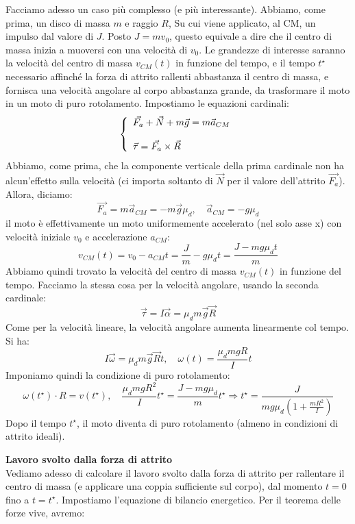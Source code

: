 \documentclass[a4paper,12pt]{article}
\begin{document}
\begin{itemize}
    Facciamo adesso un caso più complesso (e più interessante). Abbiamo, come prima, un disco di massa $m$ e raggio $R$, Su cui viene applicato,
    al CM, un impulso dal valore di $J$. Posto $J = mv_0$, questo equivale a dire che il centro di massa inizia a muoversi con una velocità di $v_0$.
    Le grandezze di interesse saranno la velocità del centro di massa $v_{CM}(t)$ in funzione del tempo, e il tempo $t^\star$ necessario affinché la forza di attrito
    rallenti abbastanza il centro di massa, e fornisca una velocità angolare al corpo abbastanza grande, da trasformare il moto in un moto di puro rotolamento.
    Impostiamo le equazioni cardinali:
    $$ 
    \left\{\begin{array}{l}
        \vec{F_a} + \vec{N} + m\vec{g} = m\vec{a}_{CM} \cr \\ 
        \vec{\tau} = \vec{F_a} \times \vec{R}
    \end{array}\right.
    $$
    Abbiamo, come prima, che la componente verticale della prima cardinale non ha alcun'effetto sulla velocità (ci importa soltanto di $\vec{N}$ per il valore dell'attrito $\vec{F_a}$).
    Allora, diciamo:
    $$ \vec{F_a} = m\vec{a}_{CM} = -m\vec{g}\mu_d, \quad \vec{a}_{CM} = -g\mu_d $$
    il moto è effettivamente un moto uniformemente accelerato (nel solo asse x) con velocità iniziale $v_0$ e accelerazione $a_{CM}$:
    $$ v_{CM}(t) = v_0 - a_{CM}t = \frac{J}{m} - g\mu_dt = \frac{J - mg\mu_dt}{m} $$
    Abbiamo quindi trovato la velocità del centro di massa $v_{CM}(t)$ in funzione del tempo. Facciamo la stessa cosa per la velocità
    angolare, usando la seconda cardinale:
    $$ \vec{\tau} = I\vec{\alpha} = \mu_dm\vec{g}\vec{R}$$
    Come per la velocità lineare, la velocità angolare aumenta linearmente col tempo. Si ha:
    $$ I\vec{\omega} = \mu_dm\vec{g}\vec{R}t, \quad \omega(t) = \frac{\mu_dmgR}{I}t $$
    Imponiamo quindi la condizione di puro rotolamento:
    $$ \omega(t^\star) \cdot R = v(t^\star), \quad \frac{\mu_dmgR^2}{I}t^\star = \frac{J-mg\mu_d}{m}t^\star \Rightarrow t^\star = \frac{J}{mg\mu_d\left( 1 + \frac{mR^2}{I} \right)}$$
    Dopo il tempo $t^\star$, il moto diventa di puro rotolamento (almeno in condizioni di attrito ideali).
    \par\smallskip
    \textbf{Lavoro svolto dalla forza di attrito} \\
     Vediamo adesso di calcolare il lavoro svolto dalla forza di attrito per rallentare il centro di massa (e applicare una coppia sufficiente sul corpo), dal momento
     $t = 0$ fino a $t = t^\star$. Impostiamo l'equazione di bilancio energetico. Per il teorema delle forze vive, avremo:

\end{itemize}
\end{document}

